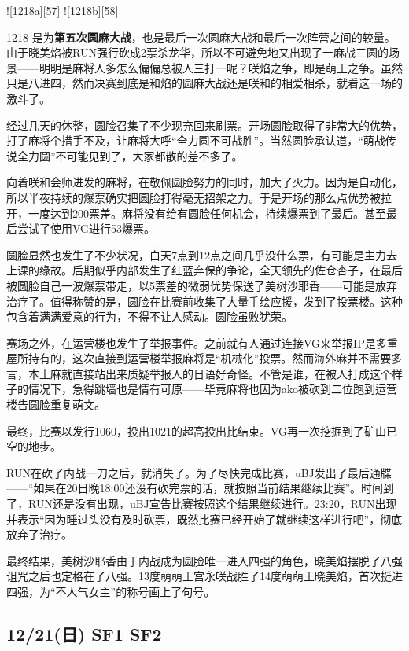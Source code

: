 ![1218a][57]
![1218b][58]

1218 是为\textbf{第五次圆麻大战}，也是最后一次圆麻大战和最后一次阵营之间的较量。由于晓美焰被RUN强行砍成2票杀龙华，所以不可避免地又出现了一麻战三圆的场景——明明是麻将人多怎么偏偏总被人三打一呢？咲焰之争，即是萌王之争。虽然只是八进四，然而决赛到底是和焰的圆麻大战还是咲和的相爱相杀，就看这一场的激斗了。

经过几天的休整，圆脸召集了不少现充回来刷票。开场圆脸取得了非常大的优势，打了麻将个措手不及，让麻将大呼“全力圆不可战胜”。当然圆脸承认道，“萌战传说全力圆”不可能见到了，大家都散的差不多了。

向着咲和会师进发的麻将，在敬佩圆脸努力的同时，加大了火力。因为是自动化，所以半夜持续的爆票确实把圆脸打得毫无招架之力。于是开场的那么点优势被拉开，一度达到200票差。麻将没有给有圆脸任何机会，持续爆票到了最后。甚至最后尝试了使用VG进行53爆票。

圆脸显然也发生了不少状况，白天7点到12点之间几乎没什么票，有可能是主力去上课的缘故。后期似乎内部发生了红蓝弃保的争论，全天领先的佐仓杏子，在最后被圆脸自己一波爆票带走，以5票差的微弱优势保送了美树沙耶香——可能是放弃治疗了。值得称赞的是，圆脸在比赛前收集了大量手绘应援，发到了投票楼。这种包含着满满爱意的行为，不得不让人感动。圆脸虽败犹荣。

赛场之外，在运营楼也发生了举报事件。之前就有人通过连接VG来举报IP是多重屋所持有的，这次直接到运营楼举报麻将是“机械化”投票。然而海外麻并不需要多言，本土麻就直接站出来质疑举报人的日语好奇怪。不管是谁，在被人打成这个样子的情况下，急得跳墙也是情有可原——毕竟麻将也因为ako被砍到二位跑到运营楼告圆脸重复萌文。

最终，比赛以发行1060，投出1021的超高投出比结束。VG再一次挖掘到了矿山已空的地步。

RUN在砍了内战一刀之后，就消失了。为了尽快完成比赛，uBJ发出了最后通牒——“如果在20日晚18:00还没有砍完票的话，就按照当前结果继续比赛”。时间到了，RUN还是没有出现，uBJ宣告比赛按照这个结果继续进行。23:20，RUN出现并表示“因为睡过头没有及时砍票，既然比赛已经开始了就继续这样进行吧”，彻底放弃了治疗。

最终结果，美树沙耶香由于内战成为圆脸唯一进入四强的角色，晓美焰摆脱了八强诅咒之后也定格在了八强。13度萌萌王宫永咲战胜了14度萌萌王晓美焰，首次挺进四强，为“不人气女主”的称号画上了句号。

\subsection{12/21(日) SF1 SF2}



